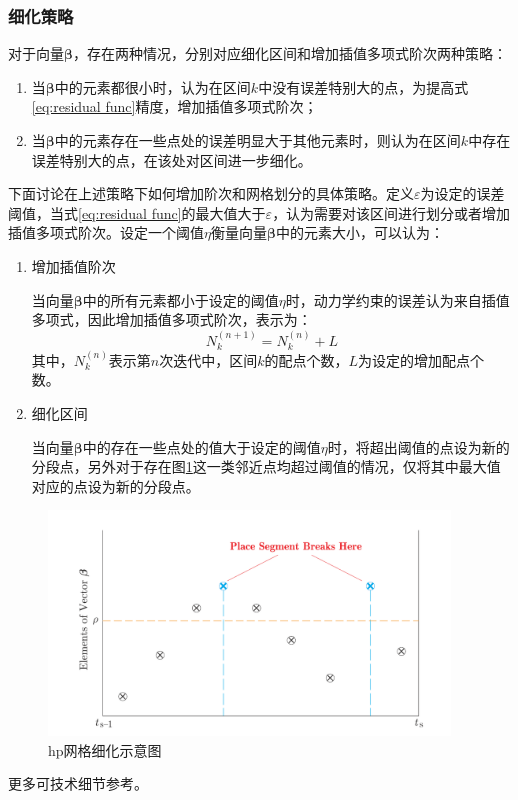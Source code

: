 \subsubsection{细化策略}
对于向量$ \bm{\beta} $，存在两种情况，分别对应细化区间和增加插值多项式阶次两种策略：
\begin{enumerate}
	\item 当$ \bm{\beta} $中的元素都很小时，认为在区间$ k $中没有误差特别大的点，为提高式\eqref{eq:residual func}精度，增加插值多项式阶次；
	\item 当$ \bm{\beta} $中的元素存在一些点处的误差明显大于其他元素时，则认为在区间$ k $中存在误差特别大的点，在该处对区间进一步细化。
\end{enumerate}

下面讨论在上述策略下如何增加阶次和网格划分的具体策略。定义$ \varepsilon $为设定的误差阈值，当式\eqref{eq:residual func}的最大值大于$ \varepsilon $，认为需要对该区间进行划分或者增加插值多项式阶次。设定一个阈值$ \eta$衡量向量$ \bm{\beta} $中的元素大小，可以认为：
\begin{enumerate}
	\item 增加插值阶次\par
	      当向量$ \bm{\beta} $中的所有元素都小于设定的阈值$ \eta $时，动力学约束的误差认为来自插值多项式，因此增加插值多项式阶次，表示为：
	      \begin{equation}
		      N^{(n+1)}_k=N^{(n)}_k+L
	      \end{equation}
	      其中，$ N^{(n)}_k $表示第$ n $次迭代中，区间$ k $的配点个数，$ L $为设定的增加配点个数。
	\item 细化区间\par
	      当向量$ \bm{\beta} $中的存在一些点处的值大于设定的阈值$ \eta $时，将超出阈值的点设为新的分段点，另外对于存在图\ref{fig:hp-sketch}这一类邻近点均超过阈值的情况，仅将其中最大值对应的点设为新的分段点。
\end{enumerate}
\begin{figure}[htb]
	\begin{small}
		\begin{center}
			\includegraphics[width=0.95\textwidth]{figures/hp-sketch}
		\end{center}
		\caption{hp网格细化示意图}
		\label{fig:hp-sketch}
	\end{small}
\end{figure}
更多可技术细节参考。

